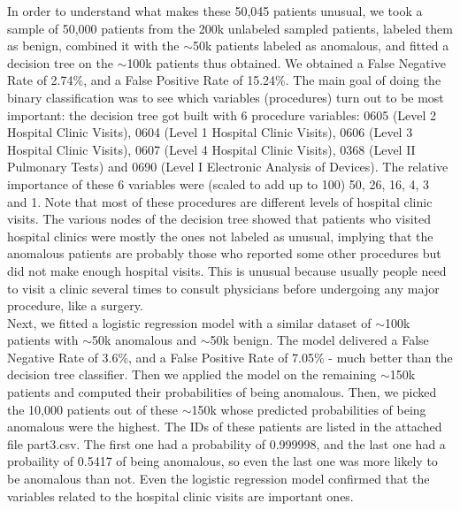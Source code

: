 In order to understand what makes these 50,045 patients unusual, we took a sample of 50,000 patients from the 200k unlabeled sampled patients, labeled them as benign, combined it with the $\sim$50k patients labeled as anomalous, and fitted a decision tree on the $\sim$100k patients thus obtained. We obtained a False Negative Rate of 2.74\%, and a False Positive Rate of 15.24\%. The main goal of doing the binary classification was to see which variables (procedures) turn out to be most important: the decision tree got built with 6 procedure variables: 0605 (Level 2 Hospital Clinic Visits), 0604 (Level 1 Hospital Clinic Visits), 0606 (Level 3 Hospital Clinic Visits), 0607 (Level 4 Hospital Clinic Visits), 0368 (Level II Pulmonary Tests) and 0690 (Level I Electronic Analysis of Devices). The relative importance of these 6 variables were (scaled to add up to 100) 50, 26, 16, 4, 3 and 1. Note that most of these procedures are different levels of hospital clinic visits. The various nodes of the decision tree showed that patients who visited hospital clinics were mostly the ones not labeled as unusual, implying that the anomalous patients are probably those who reported some other procedures but did not make enough hospital visits. This is unusual because usually people need to visit a clinic several times to consult physicians before undergoing any major procedure, like a surgery.\\

Next, we fitted a logistic regression model with a similar dataset of $\sim$100k patients with $\sim$50k anomalous and $\sim$50k benign. The model delivered a False Negative Rate of 3.6\%, and a False Positive Rate of 7.05\% - much better than the decision tree classifier. Then we applied the model on the remaining $\sim$150k patients and computed their probabilities of being anomalous. Then, we picked the 10,000 patients out of these $\sim$150k whose predicted probabilities of being anomalous were the highest. The IDs of these patients are listed in the attached file part3.csv. The first one had a probability of 0.999998, and the last one had a probaility of 0.5417 of being anomalous, so even the last one was more likely to be anomalous than not. Even the logistic regression model confirmed that the variables related to the hospital clinic visits are important ones.\\

